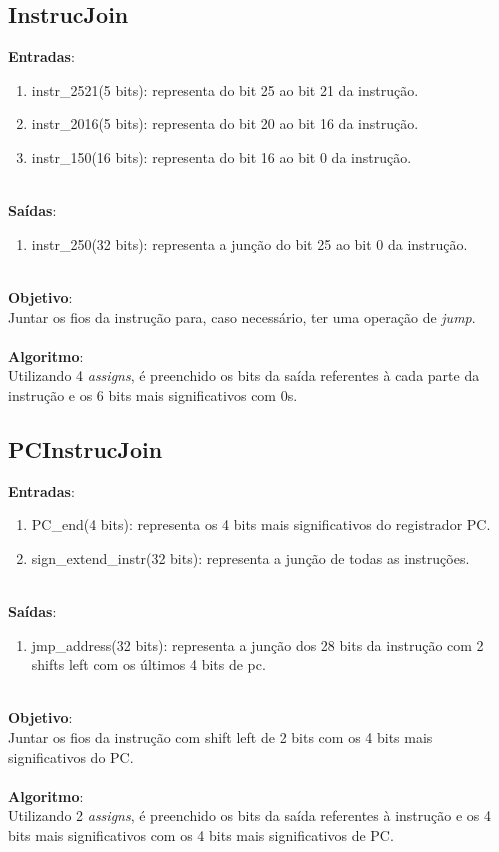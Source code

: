 \documentclass{article}
\begin{document}
    \newpage
    \subsection{InstrucJoin}
    \textbf{Entradas}:
    \begin{enumerate}
        \item instr\_2521(5 bits): representa do bit 25 ao bit 21 da instrução.
        \item instr\_2016(5 bits): representa do bit 20 ao bit 16 da instrução.
	    \item instr\_150(16 bits): representa do bit 16 ao bit 0 da instrução.\\
    \end{enumerate}
    \\
    \textbf{Saídas}:
    \begin{enumerate}
        \item instr\_250(32 bits): representa a junção do bit 25 ao bit 0 da instrução.\\
    \end{enumerate}
    \\
    \textbf{Objetivo}:\\
    Juntar os fios da instrução para, caso necessário, ter uma operação de {\it jump}.
    \\
    \\
    \textbf{Algoritmo}:\\
    Utilizando 4 {\it assigns}, é preenchido os bits da saída referentes à cada parte da instrução e os 6 bits mais significativos com 0s.
    \\
    \subsection{PCInstrucJoin}
    \textbf{Entradas}:
    \begin{enumerate}
        \item PC\_end(4 bits): representa os 4 bits mais significativos do registrador PC.
        \item sign\_extend\_instr(32 bits): representa a junção de todas as instruções.\\
    \end{enumerate}
    \\
    \textbf{Saídas}:
    \begin{enumerate}
        \item jmp\_address(32 bits): representa a junção dos 28 bits da instrução com 2 shifts left com os últimos 4 bits de pc.\\ 
    \end{enumerate}
    \\
    \textbf{Objetivo}:\\
    Juntar os fios da instrução com shift left de 2 bits com os 4 bits mais significativos do PC.
    \\
    \\
    \textbf{Algoritmo}:\\
    Utilizando 2 {\it assigns}, é preenchido os bits da saída referentes à instrução e os 4 bits mais significativos com os 4 bits mais significativos de PC.
    
\end{document}
